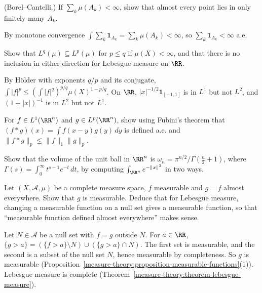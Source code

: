 \begin{exercise}\label{measure-theory:exercise-borel-cantelli}
(Borel--Cantelli.) If $\sum_k\mu(A_k) < \infty$, show that almost every point lies in only finitely many $A_k$.
\end{exercise}

\begin{solution}
By monotone convergence $\int\sum_k\mathbf{1}_{A_k} = \sum_k\mu(A_k) < \infty$, so $\sum_k\mathbf{1}_{A_k} < \infty$ a.e.
\end{solution}

\begin{exercise}\label{measure-theory:exercise-lp-inclusions}
Show that $L^q(\mu) \subseteq L^p(\mu)$ for $p \leq q$ if $\mu(X) < \infty$, and that there is no inclusion in either direction for Lebesgue measure on $\RR$.
\end{exercise}

\begin{solution}
By H\"older with exponents $q/p$ and its conjugate, $\int|f|^p \leq (\int|f|^q)^{p/q}\mu(X)^{1 - p/q}$. On $\RR$, $|x|^{-1/2}\mathbf{1}_{[-1,1]}$ is in $L^1$ but not $L^2$, and $(1 + |x|)^{-1}$ is in $L^2$ but not $L^1$.
\end{solution}

\begin{exercise}\label{measure-theory:exercise-convolution}
For $f \in L^1(\RR^n)$ and $g \in L^p(\RR^n)$, show using Fubini's theorem that $(f * g)(x) = \int f(x - y)g(y)\,dy$ is defined a.e. and $\|f * g\|_p \leq \|f\|_1\|g\|_p$.
\end{exercise}

\begin{exercise}\label{measure-theory:exercise-ball-volume}
Show that the volume of the unit ball in $\RR^n$ is $\omega_n = \pi^{n/2}/\Gamma(\frac n2 + 1)$, where $\Gamma(s) = \int_0^\infty t^{s-1}e^{-t}\,dt$, by computing $\int_{\RR^n}e^{-\|x\|^2}$ in two ways.
\end{exercise}

\begin{exercise}\label{measure-theory:exercise-ae-measurable}
Let $(X, \mathcal{A}, \mu)$ be a complete measure space, $f$ measurable and $g = f$ almost everywhere. Show that $g$ is measurable. Deduce that for Lebesgue measure, changing a measurable function on a null set
gives a measurable function, so that ``measurable function defined almost everywhere'' makes sense.
\end{exercise}

\begin{solution}
Let $N \in \mathcal{A}$ be a null set with $f = g$ outside $N$. For $a \in \RR$, $\{g > a\} = (\{f > a\} \setminus N) \cup (\{g > a\} \cap N)$. The first set is measurable, and the second is a subset of
the null set $N$, hence measurable by completeness. So $g$ is measurable (Proposition~\ref{measure-theory:proposition-measurable-functions}(1)). Lebesgue measure is complete
(Theorem~\ref{measure-theory:theorem-lebesgue-measure}).
\end{solution}

